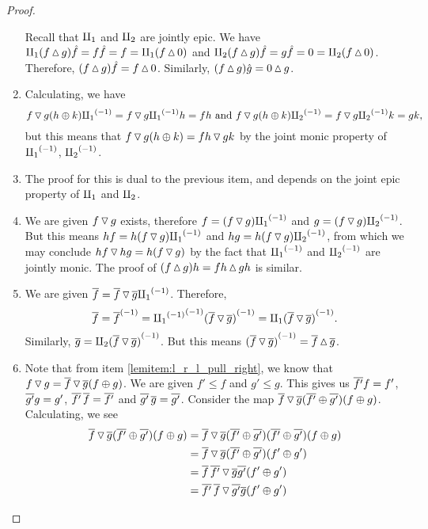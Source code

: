 \begin{proof}
\begin{enumerate}[{(}i{)}]
      Recall that $\amalg_{1}$ and $\amalg_{2}$ are jointly epic. We have
      $\amalg_{1}(f \operatorname{\vartriangle} g)\hat{f} = f\hat{f} = f = \amalg_{1}(f\operatorname{\vartriangle} 0) $ and
      $\amalg_{2}(f \operatorname{\vartriangle} g)\hat{f} = g\hat{f} = 0= \amalg_{2}(f\operatorname{\vartriangle} 0)$.
      Therefore, $(f \operatorname{\vartriangle} g)\hat{f} = f \operatorname{\vartriangle} 0$. Similarly,
      $(f \operatorname{\vartriangle} g) \hat{g} = 0 \operatorname{\vartriangle} g$.
    \item Calculating, we have
      \[
        f \operatorname{\triangledown} g (h \oplus k) {\amalg_{1}}^{(-1)} = f\operatorname{\triangledown} g {\amalg_{1}}^{(-1)} h = f h \text{ and }
        f \operatorname{\triangledown} g (h \oplus k) {\amalg_{2}}^{(-1)} = f\operatorname{\triangledown} g {\amalg_{2}}^{(-1)} k = g k,
      \]
      but this means that
      $f \operatorname{\triangledown} g (h \oplus k) = f h \operatorname{\triangledown} g k$ by the joint monic property of ${\amalg_{1}}^{(-1)}$, ${\amalg_{2}}^{(-1)}$.
    \item The proof for this is dual to the previous item, and depends on the joint epic property
      of $\amalg_{1}$ and $\amalg_{2}$.
    \item We are given $f\operatorname{\triangledown} g$ exists, therefore $f = (f\operatorname{\triangledown} g){\amalg_{1}}^{(-1)}$ and
      $g = (f\operatorname{\triangledown} g){\amalg_{2}}^{(-1)}$. But this means $hf = h(f\operatorname{\triangledown} g){\amalg_{1}}^{(-1)}$ and
      $hg = h(f\operatorname{\triangledown} g){\amalg_{2}}^{(-1)}$, from which we may conclude $hf \operatorname{\triangledown} hg = h(f\operatorname{\triangledown} g)$ by
      the fact that ${\amalg_{1}}^{(-1)}$ and ${\amalg_{2}}^{(-1)}$ are jointly monic. The proof of
      $(f\operatorname{\vartriangle} g)h = f h \operatorname{\vartriangle} g h$ is similar.
    \item We are given $\overline{f} = \overline{f}\operatorname{\triangledown}\overline{g} {\amalg_{1}}^{(-1)}$. Therefore,
      \[
        \overline{f} = {\overline{f}}^{(-1)} = {{\amalg_{1}}^{(-1)}}^{(-1)}{(\overline{f}\operatorname{\triangledown}\overline{g})}^{(-1)}
          = \amalg_{1} {(\overline{f}\operatorname{\triangledown}\overline{g})}^{(-1)}.
      \]
      Similarly, $\overline{g} = \amalg_{2} {(\overline{f}\operatorname{\triangledown}\overline{g})}^{(-1)}$. But this means
      ${(\overline{f}\operatorname{\triangledown}\overline{g})}^{(-1)} = \overline{f}\operatorname{\vartriangle}\overline{g}$.
    \item Note that from item \ref{lemitem:l_r_l_pull_right}, we know that
      $f \operatorname{\triangledown} g  = \overline{f} \operatorname{\triangledown} \overline{g} (f\oplus g)$. We are given $f' \le f$ and $g' \le g$. This
      gives us $\overline{f'}f =f'$, $\overline{g'}g =g'$, $\overline{f'}\,\overline{f} =\overline{f'}$ and
      $\overline{g'}\,\overline{g} =\overline{g'}$. Consider the map
      $\overline{f} \operatorname{\triangledown} \overline{g} (\overline{f'}\oplus\overline{g'})(f\oplus g)$. Calculating, we see
      \begin{align*}
        \rst{f} \tjdown \rst{g} (\rst{f'}\+\rst{g'})(f\+g)
          &= \rst{f} \tjdown \rst{g} (\rst{f'}\+\rst{g'})(\rst{f'}\+\rst{g'})(f\+g) \\
          & = \rst{f} \tjdown \rst{g} (\rst{f'}\+\rst{g'})(f'\+g') \\
          & = \rst{f}\,\rst{f'} \tjdown \rst{g} \rst{g'} (f'\+g') \\
          & = \rst{f'}\,\rst{f} \tjdown \rst{g'} \rst{g} (f'\+g') \\

\end{align*}
\end{enumerate}
\end{proof}
